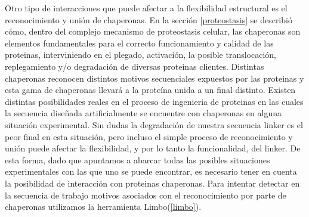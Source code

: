 







Otro tipo de interacciones que puede afectar a la flexibilidad estructural es el reconocimiento y unión de chaperonas.
En la sección \ref{proteostasis} se describió cómo, dentro del complejo mecanismo de proteostasis celular, las chaperonas son elementos fundamentales para el correcto funcionamiento y calidad de las proteinas, 
interviniendo en el plegado, activación, la posible translocación, replegamiento y/o degradación de diversas proteinas clientes.
Distintas chaperonas reconocen distintos motivos secuenciales expuestos por las proteinas y esta gama de chaperonas llevará a la proteína unida a un final distinto.
Existen distintas posibilidades reales en el proceso de ingenieria de proteinas en las cuales la secuencia diseñada artificialmente se encuentre con chaperonas en alguna situación experimental. 
Sin dudas la degradación de nuestra secuencia linker es el peor final en esta situación, 
pero incluso el simple proceso de reconocimiento y unión puede afectar la flexibilidad, y por lo tanto la funcionalidad, del linker. 
De esta forma, dado que apuntamos a abarcar todas las posibles situaciones experimentales con las que uno se puede encontrar, es necesario tener en cuenta 
la posibilidad de interacción con proteinas chaperonas. 
Para intentar detectar en la secuencia de trabajo motivos asociados con el reconocimiento por parte de chaperonas utilizamos la herramienta Limbo(\ref{limbo}). 



